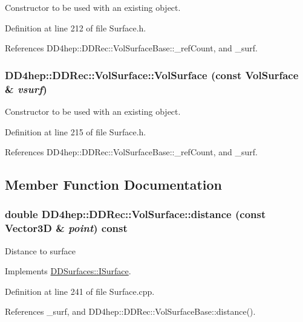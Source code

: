 Constructor to be used with an existing object. 

Definition at line 212 of file Surface.h.

References DD4hep::DDRec::VolSurfaceBase::\_\-refCount, and \_\-surf.\hypertarget{class_d_d4hep_1_1_d_d_rec_1_1_vol_surface_adf64ad2a3576cca241d5f627e26c619c}{
\subsubsection[{VolSurface}]{\setlength{\rightskip}{0pt plus 5cm}DD4hep::DDRec::VolSurface::VolSurface (const {\bf VolSurface} \& {\em vsurf})}}
\label{class_d_d4hep_1_1_d_d_rec_1_1_vol_surface_adf64ad2a3576cca241d5f627e26c619c}


Constructor to be used with an existing object. 

Definition at line 215 of file Surface.h.

References DD4hep::DDRec::VolSurfaceBase::\_\-refCount, and \_\-surf.

\subsection{Member Function Documentation}
\hypertarget{class_d_d4hep_1_1_d_d_rec_1_1_vol_surface_aeabe1f73edf8b917bede275fb8f2d4a3}{
\subsubsection[{distance}]{\setlength{\rightskip}{0pt plus 5cm}double DD4hep::DDRec::VolSurface::distance (const {\bf Vector3D} \& {\em point}) const}}
\label{class_d_d4hep_1_1_d_d_rec_1_1_vol_surface_aeabe1f73edf8b917bede275fb8f2d4a3}
Distance to surface 

Implements \hyperlink{class_d_d_surfaces_1_1_i_surface_a430ebd157354388b50218dfb356a9ca1}{DDSurfaces::ISurface}.

Definition at line 241 of file Surface.cpp.

References \_\-surf, and DD4hep::DDRec::VolSurfaceBase::distance().

